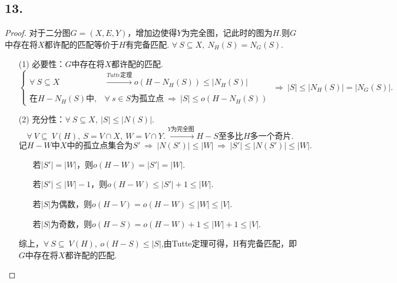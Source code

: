 \documentclass{article}
\begin{document}
\subsection*{13.}
\begin{proof}
    对于二分图$G=(X,E,Y)$，增加边使得$Y$为完全图，记此时的图为$H$.则$G$中存在将$X$都许配的匹配等价于$H$有完备匹配.
    $\forall\ S\subseteq X,\ N_{H} (S)=N_{G} (S)$.
    \begin{enumerate}
        \item [(1)]必要性：$G$中存在将$X$都许配的匹配.
        \[
            \begin{cases}
                \forall\ S\subseteq X & \xrightarrow{Tutte\mbox{定理}} o(H-N_H (S))\leq |N_H (S)|\\
                \\
                \mbox{在}H-N_H (S)\mbox{中},&\forall\ s\in S\mbox{为孤立点}\ \Rightarrow\ |S|\leq o(H- N_H (S))
            \end{cases}
            \ \Rightarrow\ 
            |S|\leq |N_H (S)|=|N_G (S)|.
        \]
        \item [(2)]充分性：$\forall\ S\subseteq X,\ |S|\leq |N(S)|$.
        \[
            \forall\ V\subseteq\ V(H),\ S=V\cap X,\ W=V\cap Y.
            \xrightarrow{Y\mbox{为完全图}}
            H-S\mbox{至多比}H\mbox{多一个奇片}.
        \]
        \[
            \mbox{记}H-W\mbox{中}X\mbox{中的孤立点集合为}S'
            \ \Rightarrow\ 
            |N(S')|\leq |W|
            \ \Rightarrow\ 
            |S'|\leq |N(S')|\leq |W|.
        \]
        \begin{enumerate}
            \item []若$|S'|=|W|$，则$o(H-W)=|S'|=|W|$.
            \item []若$|S'|\leq |W|-1$，则$o(H-W)\leq |S'|+1\leq |W|$.
            \item []若$|S|$为偶数，则$o(H-V)=o(H-W)\leq |W|\leq |V|$.
            \item []若$|S|$为奇数，则$o(H-S)=o(H-W)+1\leq |W|+1\leq |V|$.
        \end{enumerate}
        综上，$\forall\ S\subseteq\ V(H),\ o(H-S)\leq |S|$,由Tutte定理可得，H有完备匹配，即$G$中存在将$X$都许配的匹配.
    \end{enumerate}
\end{proof}
\end{document}
